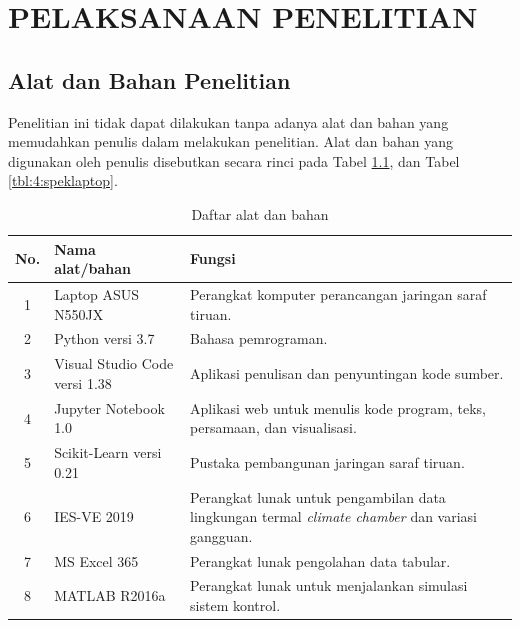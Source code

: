 \chapter{PELAKSANAAN PENELITIAN}
\label{pelaksanaan-penelitian}

\section{Alat dan Bahan Penelitian}
Penelitian ini tidak dapat dilakukan tanpa adanya alat dan bahan yang memudahkan penulis dalam melakukan penelitian. Alat dan bahan yang digunakan oleh penulis disebutkan secara rinci pada Tabel \ref{tbl:4:alatbahan}, dan Tabel \ref{tbl:4:speklaptop}.

\begin{table}[!h]
	\caption{Daftar alat dan bahan}
	\label{tbl:4:alatbahan}
	\centering
	\begin{tabular}{|c|p{5cm}|p{8cm}|}
		\hline
		No. & Nama alat/bahan & Fungsi \\
		\hline
		1 & Laptop ASUS N550JX & Perangkat komputer perancangan jaringan saraf tiruan. \\
		\hline
		2 & Python versi 3.7 & Bahasa pemrograman. \\
		\hline
		3 & Visual Studio Code versi 1.38 & Aplikasi penulisan dan penyuntingan kode sumber. \\
		\hline
		4 & Jupyter Notebook 1.0 & Aplikasi web untuk menulis kode program, teks, persamaan, dan visualisasi. \\
		\hline
		5 & Scikit-Learn versi 0.21 & Pustaka pembangunan jaringan saraf tiruan. \\
		\hline
		6 & IES-VE 2019 & Perangkat lunak untuk pengambilan data lingkungan termal \textit{climate chamber} dan variasi gangguan. \\
		\hline
		7 & MS Excel 365 & Perangkat lunak pengolahan data tabular. \\
		\hline
		8 & MATLAB R2016a & Perangkat lunak untuk menjalankan simulasi sistem kontrol. \\
		\hline
	\end{tabular}
\end{table}

